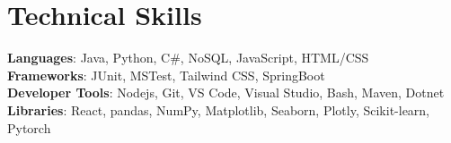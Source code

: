\documentclass[letterpaper,11pt]{article}
\begin{document}
\section{Technical Skills}
 \begin{itemize}[leftmargin=0.15in, label={}]
    \small{\item{
     \textbf{Languages}{: Java, Python, C\#, NoSQL, JavaScript, HTML/CSS} \\
     \textbf{Frameworks}{: JUnit, MSTest, Tailwind CSS, SpringBoot} \\
     \textbf{Developer Tools}{: Nodejs, Git, VS Code, Visual Studio, Bash, Maven, Dotnet} \\
     \textbf{Libraries}{: React, pandas, NumPy, Matplotlib, Seaborn, Plotly, Scikit-learn, Pytorch}
    }}
 \end{itemize}


\end{document}
